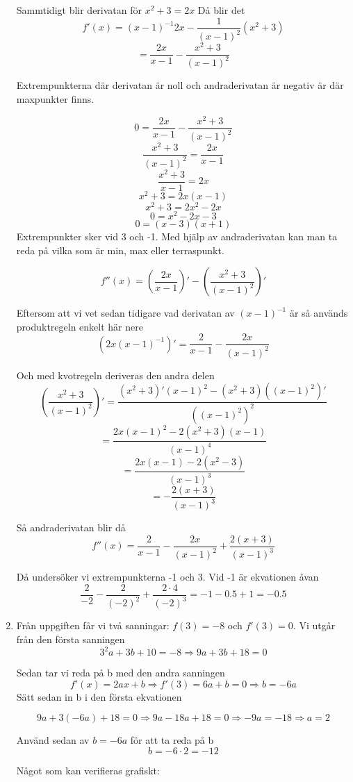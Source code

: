 \documentclass[a4paper,12pt]{article}
\begin{document}
\begin{enumerate}
    Sammtidigt blir derivatan för $x^2+3=2x$
    Då blir det 
    $$f'(x)=(x-1)^{-1}2x-\frac{1}{(x-1)^2}(x^2+3)$$
    $$=\frac{2x}{x-1}-\frac{x^2+3}{(x-1)^2}$$
    
    Extrempunkterna där derivatan är noll och
    andraderivatan är negativ är där 
    maxpunkter finns. 
    
    $$0=\frac{2x}{x-1}-\frac{x^2+3}{(x-1)^2}$$
    $$\frac{x^2+3}{(x-1)^2}=\frac{2x}{x-1}$$
    $$\frac{x^2+3}{x-1}={2x}$$
    $$x^2+3=2x(x-1)$$
    $$x^2+3=2x^2-2x$$
    $$0=x^2-2x-3$$
    $$0=(x-3)(x+1)$$
    Extrempunkter sker vid 3 och -1. Med hjälp av andraderivatan
    kan man ta reda på vilka som är min, max eller terraspunkt.
    
    $$f''(x)=(\frac{2x}{x-1})'-(\frac{x^2+3}{(x-1)^2})'$$
    
    Eftersom att vi vet sedan tidigare vad derivatan av 
    $(x-1)^{-1}$ är så används produktregeln enkelt här nere
    $$(2x(x-1)^{-1})'=\frac{2}{x-1}-\frac{2x}{(x-1)^2}$$
    
    Och med kvotregeln deriveras den andra delen
    $$(\frac{x^2+3}{(x-1)^2})'
    =\frac{(x^2+3)'(x-1)^2 - (x^2+3)((x-1)^2)'}{((x-1)^2)^2}$$
    $$=\frac{2x(x-1)^2-2(x^2+3)(x-1)}{(x-1)^4}$$
    $$=\frac{2x(x-1)-2(x^2-3)}{(x-1)^3}$$
    $$=-\frac{2(x+3)}{(x-1)^3}$$

    Så andraderivatan blir då
    $$f''(x)=\frac{2}{x-1}-\frac{2x}{(x-1)^2}+\frac{2(x+3)}{(x-1)^3}$$
    
    Då undersöker vi extrempunkterna -1 och 3. Vid -1 är ekvationen åvan
    $$\frac{2}{-2}-\frac{2}{(-2)^2}+\frac{2\cdot 4}{(-2)^3}
    = -1-0.5+1=-0.5$$

    \item 
    Från uppgiften får vi två sanningar: $f(3)=-8$ och $f'(3)=0$. 
    Vi utgår från den första sanningen
    $$3^2a+3b+10=-8\Rightarrow 9a+3b+18=0$$

    Sedan tar vi reda på b med den andra sanningen
    $$f'(x)=2ax+b\Rightarrow f'(3)=6a+b=0\Rightarrow b=-6a$$
    Sätt sedan in b i den första ekvationen

    $$9a+3(-6a)+18=0\Rightarrow 9a-18a+18=0 
    \Rightarrow -9a=-18\Rightarrow a=2$$

    Använd sedan av $b=-6a$ för att ta reda på b
    $$b=-6\cdot 2= -12$$

    Något som kan verifieras grafiskt:


\end{enumerate}
\end{document}
